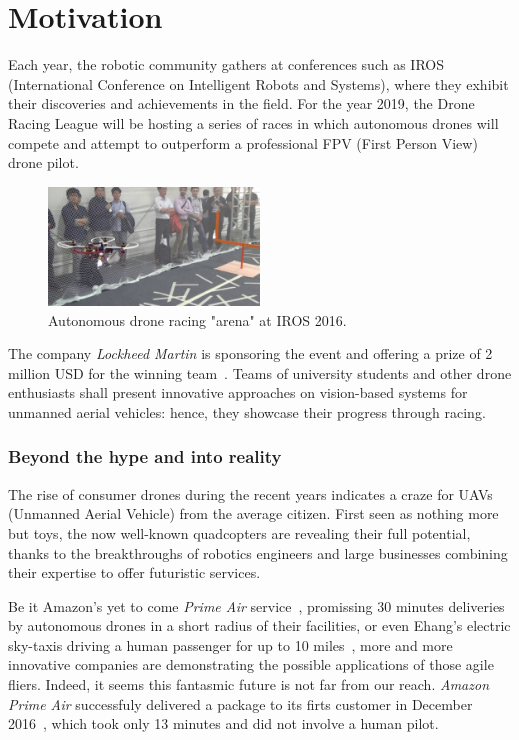 \section{Motivation}
Each year, the robotic community gathers at conferences such as IROS
(International Conference on Intelligent Robots and Systems), where they
exhibit their discoveries and achievements in the field. For the year 2019, the
Drone Racing League will be hosting a series of races in which autonomous drones
will compete and attempt to outperform a professional FPV (First Person View)
drone pilot.\\

\begin{figure}[h]
	\centering
	\includegraphics[width=0.5\textwidth]{figure/iros_2016.jpg}
	\caption{Autonomous drone racing "arena" at IROS 2016.}
	\label{fig:iros}
\end{figure}

The company \emph{Lockheed Martin} is sponsoring the event and offering a prize of 2
million USD for the winning team~\cite{LockheedDRL}. Teams of university
students and other drone enthusiasts shall present innovative approaches on
vision-based systems for unmanned aerial vehicles: hence, they showcase their
progress through racing.\\

\subsubsection{Beyond the hype and into reality}
The rise of consumer drones during the recent years indicates a craze for UAVs
(Unmanned Aerial Vehicle) from the average citizen. First seen as nothing more
but toys, the now well-known quadcopters are revealing their full potential,
thanks to the breakthroughs of robotics engineers and large businesses combining
their expertise to offer futuristic services.

Be it Amazon's yet to come \emph{Prime Air} service~\cite{PrimeAir}, promissing
30 minutes deliveries by autonomous drones in a short radius of their
facilities, or even Ehang's electric sky-taxis driving a human passenger for up
to 10 miles~\cite{Ehang184}, more and more innovative companies are
demonstrating the possible applications of those agile fliers.  Indeed, it seems
this fantasmic future is not far from our reach. \emph{Amazon Prime Air}
successfuly delivered a package to its firts customer in December
2016~\cite{PrimeAirFirst}, which took only 13 minutes and did not involve a
human pilot.\\

